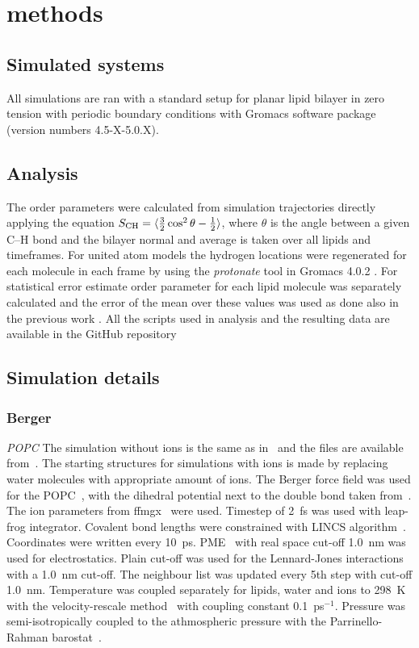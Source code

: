 \documentclass[pre,aps,floatfix,authordate1-4,twocolumn]{revtex4-1}
\begin{document}
\section{methods}

\subsection{Simulated systems}
All simulations are ran with a standard setup for planar lipid bilayer in zero tension
with periodic boundary conditions with Gromacs software package (version numbers 4.5-X-5.0.X).

\subsection{Analysis}
The order parameters were calculated from simulation trajectories directly applying the equation
$S_{{\rm CH}}=\langle \frac{3}{2}  \cos^2 \theta-\frac{1}{2} \rangle$,
where $\theta$ is the angle between a given C--H bond and the bilayer normal and average is taken
over all lipids and timeframes. For united atom models the hydrogen locations
were regenerated for each molecule in each frame by using the {\it protonate} tool in 
Gromacs 4.0.2 \cite{gromacsMANUAL402}. For statistical error estimate order parameter
for each lipid molecule was separately calculated and the error of the mean over these 
values was used as done also in the previous work \cite{botan15}.
All the scripts used in analysis and the resulting data are available in the GitHub repository \cite{githubIONpaper}

\subsection{Simulation details}
\subsubsection{Berger}
{\it POPC} The simulation without ions is the same as in~\cite{ferreira13} and the files are available from~\cite{bergerFILESpopc}. 
The starting structures for simulations with ions is made by replacing water molecules with appropriate amount of ions.
The Berger force field was used for the POPC~\cite{berger97}, with the dihedral potential next to the double bond 
taken from~\cite{bachar04}. The ion parameters from ffmgx~\cite{straatsma88} were used.
Timestep of 2~fs was used with leap-frog integrator. Covalent bond lengths were constrained with LINCS algorithm~\cite{hess97,hess07}. 
Coordinates were written every 10~ps. PME~\cite{darden93,essman95} with real space cut-off 1.0~nm was used 
for electrostatics. Plain cut-off was used for the Lennard-Jones interactions with a 1.0~nm cut-off.
The neighbour list was updated every 5th step with cut-off 1.0~nm. Temperature was coupled separately
for lipids, water and ions to 298~K with the velocity-rescale method~\cite{bussi07} with coupling constant 0.1~ps$^{-1}$.
Pressure was semi-isotropically coupled to the athmospheric pressure with the Parrinello-Rahman barostat~\cite{parrinello81}.
\end{document}
